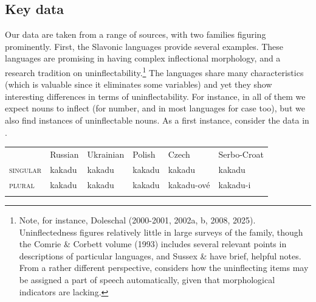 \documentclass[output=paper]{langscibook}
\begin{document}
\subsection{\textbf{Key} \textbf{data}}

Our data are taken from a range of sources, with two families figuring prominently. First, the Slavonic languages provide several examples. These languages are promising in having complex inflectional morphology, and a research tradition on uninflectability.\footnote{ \textrm{Note, for instance, Doleschal (2000-2001, 2002a, b, 2008, 2025). Uninflectedness figures relatively little in large surveys of the family, though the Comrie \& Corbett volume (1993) includes several relevant points in descriptions of particular languages, and Sussex \& \citet[250-251]{Cubberley2006} have brief, helpful notes. From a rather different perspective, \citet{Maldjieva1995} considers how the uninflecting items may be assigned a part of speech automatically, given that morphological indicators are lacking.}} The languages share many characteristics (which is valuable since it eliminates some variables) and yet they show interesting differences in terms of uninflectability. For instance, in all of them we expect nouns to inflect (for number, and in most languages for case too), but we also find instances of uninflectable nouns. As a first instance, consider the data in .


\begin{tabularx}{\textwidth}{XXXXXX}

\lsptoprule
\multicolumn{1}{c}{} & Russian & Ukrainian & Polish & Czech & Serbo-Croat\\
\textsc{singular} & kakadu & kakadu & kakadu & kakadu & kakadu\\
\textsc{plural} & kakadu & kakadu & kakadu & kakadu-ové & kakadu-i\\
\lspbottomrule
\end{tabularx}
\begin{table}
\caption{\textit{Kakadu} ‘cockatoo’ in a selection of Slavonic languages}
\label{tab:key:1}
\end{table}
\end{document}
